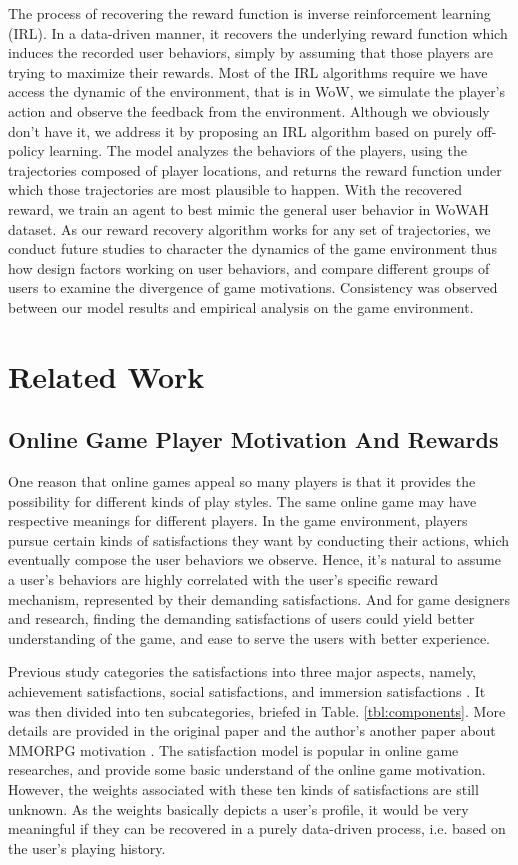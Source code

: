 \documentclass{sigchi}
\begin{document}
The process of recovering the reward function is inverse reinforcement learning (IRL).
In a data-driven manner, it recovers the underlying reward function which induces the recorded user behaviors, simply by assuming that those players are trying to maximize their rewards.
Most of the IRL algorithms require we have access the dynamic of the environment, that is in WoW, we simulate the player's action and observe the feedback from the environment.
Although we obviously don't have it, we address it by proposing an IRL algorithm based on purely off-policy learning.
The model analyzes the behaviors of the players, using the trajectories composed of player locations, and returns the reward function under which those trajectories are most plausible to happen.
With the recovered reward, we train an agent to best mimic the general user behavior in WoWAH dataset.
As our reward recovery algorithm works for any set of trajectories, we conduct future studies to character the dynamics of the game environment thus how design factors working on user behaviors, and compare different groups of users to examine the divergence of game motivations.
Consistency was observed between our model results and empirical analysis on the game environment.


\section{Related Work}

\subsection{Online Game Player Motivation And Rewards}

One reason that online games appeal so many players is that it provides the possibility for different kinds of play styles. 
The same online game may have respective meanings for different players.
In the game environment, players pursue certain kinds of satisfactions they want by conducting their actions, which eventually compose the user behaviors we observe.
Hence, it's natural to assume a user's behaviors are highly correlated with the user's specific reward mechanism, represented by their demanding satisfactions.
And for game designers and research, finding the demanding satisfactions of users could yield better understanding of the game, and ease to serve the users with better experience.

Previous study categories the satisfactions into three major aspects, namely, achievement satisfactions, social satisfactions, and immersion satisfactions \cite{yee2006motivations}.
It was then divided into ten subcategories, briefed in Table. \ref{tbl:components}.
More details are provided in the original paper and the author's another paper about MMORPG motivation \cite{yee2006demographics}.
The satisfaction model is popular in online game researches, and provide some basic understand of the online game motivation.
However, the weights associated with these ten kinds of satisfactions are still unknown.
As the weights basically depicts a user's profile, it would be very meaningful if they can be recovered in a purely data-driven process, i.e. based on the user's playing history.
\end{document}
